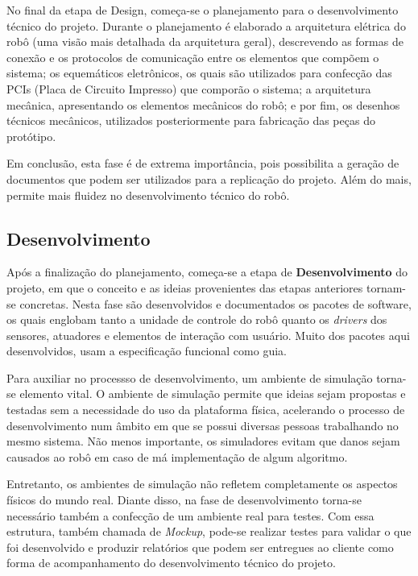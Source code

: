 No final da etapa de Design, começa-se o planejamento para o desenvolvimento técnico do projeto. Durante o planejamento é elaborado a arquitetura elétrica do robô (uma visão mais detalhada da arquitetura geral), descrevendo as formas de conexão e os protocolos de comunicação entre os elementos que compõem o sistema; os equemáticos eletrônicos, os quais são utilizados para confecção das PCIs (Placa de Circuito Impresso) que comporão o sistema; a arquitetura mecânica, apresentando os elementos mecânicos do robô; e por fim, os desenhos técnicos mecânicos, utilizados posteriormente para fabricação das peças do protótipo. 

Em conclusão, esta fase é de extrema importância, pois possibilita a geração de documentos que podem ser utilizados para a replicação do projeto. Além do mais, permite mais fluidez no desenvolvimento técnico do robô.

\subsection{Desenvolvimento}
\label{subsec:metodologia_desenvolvimento}

Após a finalização do planejamento, começa-se a etapa de \textbf{Desenvolvimento} do projeto, em que o conceito e as ideias provenientes das etapas anteriores tornam-se concretas. Nesta fase são desenvolvidos e documentados os pacotes de software, os quais englobam tanto a unidade de controle do robô quanto os \textit{drivers} dos sensores, atuadores e elementos de interação com usuário. Muito dos pacotes aqui desenvolvidos, usam a especificação funcional como guia. 

Para auxiliar no processso de desenvolvimento, um ambiente de simulação torna-se elemento vital. O ambiente de simulação permite que ideias sejam propostas e testadas sem a necessidade do uso da plataforma física, acelerando o processo de desenvolvimento num âmbito em que se possui diversas pessoas trabalhando no mesmo sistema. Não menos importante, os simuladores evitam que danos sejam causados ao robô em caso de má implementação de algum algoritmo. 

Entretanto, os ambientes de simulação não refletem completamente os aspectos físicos do mundo real. Diante disso, na fase de desenvolvimento torna-se necessário também a confecção de um ambiente real para testes. Com essa estrutura, também chamada de \textit{Mockup}, pode-se realizar testes para validar o que foi desenvolvido e produzir relatórios que podem ser entregues ao cliente  como forma de acompanhamento do desenvolvimento técnico do projeto.

